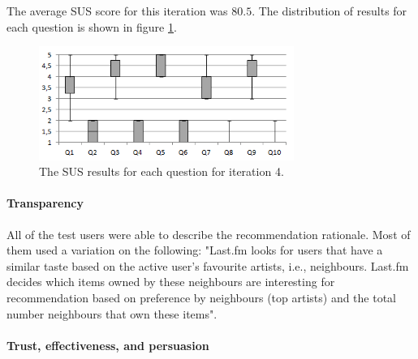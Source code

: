 The average SUS score for this iteration was $80.5$. The distribution of results for each question is shown in figure \ref{fig:iterations_sus_scores_it4_boxplots}.

\begin{figure}
	\begin{center}
		\includegraphics[width=8.3cm]{img/iterations_sus_scores_it4_boxplots}
	\end{center}
	\caption{The SUS results for each question for iteration 4.}
	\label{fig:iterations_sus_scores_it4_boxplots}
\end{figure}


\paragraph{Transparency}

All of the test users were able to describe the recommendation rationale. Most of them used a variation on the following: "Last.fm looks for users that have a similar taste based on the active user's favourite artists, i.e., neighbours. Last.fm decides which items owned by these neighbours are interesting for recommendation based on preference by neighbours (top artists) and the total number neighbours that own these items".


\paragraph{Trust, effectiveness, and persuasion}

